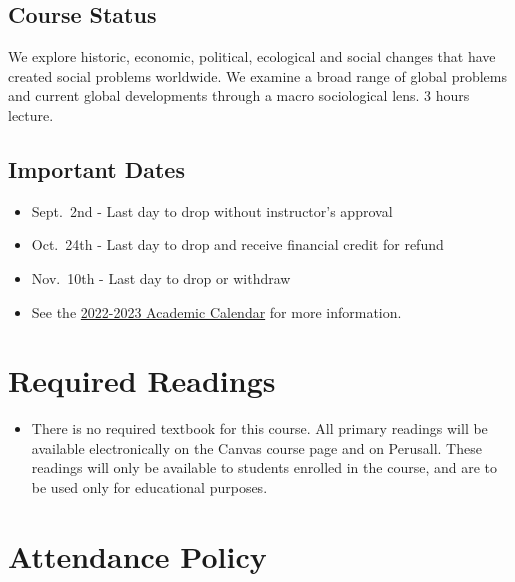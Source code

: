 \documentclass[11pt,]{article}
\providecommand{\tightlist}{%
  \setlength{\itemsep}{0pt}\setlength{\parskip}{0pt}}
\begin{document}
\hypertarget{course-status}{%
\subsection{Course Status}\label{course-status}}

We explore historic, economic, political, ecological and social changes
that have created social problems worldwide. We examine a broad range of
global problems and current global developments through a macro
sociological lens. 3 hours lecture.

\hypertarget{important-dates}{%
\subsection{Important Dates}\label{important-dates}}

\begin{itemize}
\tightlist
\item
  Sept.~2nd - Last day to drop without instructor's approval\\
\item
  Oct.~24th - Last day to drop and receive financial credit for refund\\
\item
  Nov.~10th - Last day to drop or withdraw\\
\item
  See the
  \href{https://www.csuchico.edu/apss/calendar/aca-cal-2022-23.shtml}{2022-2023
  Academic Calendar} for more information.
\end{itemize}

\hypertarget{required-readings}{%
\section{Required Readings}\label{required-readings}}

\begin{itemize}
\tightlist
\item
  There is no required textbook for this course. All primary readings
  will be available electronically on the Canvas course page and on
  Perusall. These readings will only be available to students enrolled
  in the course, and are to be used only for educational purposes.
\end{itemize}

\hypertarget{attendance}{%
\section{Attendance Policy}\label{attendance}}
\end{document}
